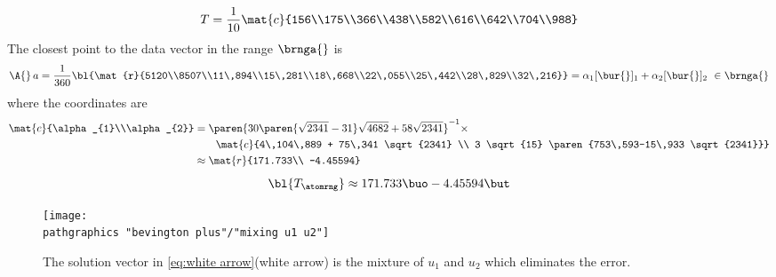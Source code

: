   \begin{equation*}
        T = \frac{1}{10}\mat{c}{156\\175\\366\\438\\582\\616\\642\\704\\988}
  \end{equation*}
The closest point to the data vector in the range $\brnga{}$ is
  \begin{equation*}
        \A{}\,a = \frac{1}{360}\bl{\mat{r}{5120\\8507\\11\,894\\15\,281\\18\,668\\22\,055\\25\,442\\28\,829\\32\,216}}
         = \alpha_{1} [\bur{}]_{1} + \alpha_{2} [\bur{}]_{2} \ \in\brnga{}
  \end{equation*}
where the coordinates are
  \begin{equation*}
    \begin{split}
      \mat{c}{\alpha_{1}\\\alpha_{2}} &
        = \paren{30\paren{\sqrt{2341}-31}\sqrt{4682}+58\sqrt{2341}}^{-1} \times \\
        & \qquad 
      \mat{c}{4\,104\,889 + 75\,341 \sqrt{2341} \\ 3 \sqrt{15} \paren{753\,593-15\,933 \sqrt{2341}}} \\ &
      \approx
      \mat{r}{171.733\\ -4.45594}
    \end{split}
    \label{eq:alpha}
  \end{equation*}
  \begin{equation}   %
    \bl{T_{\atomrng}} \approx 171.733 \buo -4.45594 \but  
    \label{eq:white arrow}
  \end{equation}
\begin{figure}[htbp] %
   \centering
   \texttt{[image: \\pathgraphics "bevington plus"/"mixing u1 u2"]} 
   \caption[The solution vector is the mixture of $u_{1}$ and $u_{2}$ which eliminates error.]{The solution vector in \eqref{eq:white arrow}(white arrow) is the mixture of $u_{1}$ and $u_{2}$ which eliminates the error.}
   \label{fig:u min}
\end{figure}
